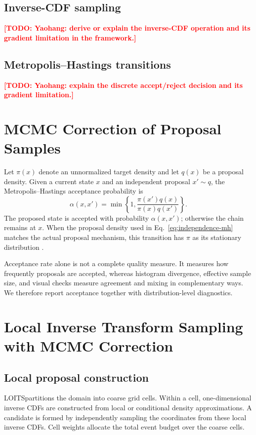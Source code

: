\documentclass[11pt]{article}
\newcommand{\todo}[1]{\textcolor{red}{\textbf{[TODO: #1]}}}
\newcommand{\methodloits}{\textsc{LOITS}}
\begin{document}
\subsection{Inverse-CDF sampling}
\todo{Yaohang: derive or explain the inverse-CDF operation and its gradient limitation in the framework.}

\subsection{Metropolis--Hastings transitions}
\todo{Yaohang: explain the discrete accept/reject decision and its gradient limitation.}

\section{MCMC Correction of Proposal Samples}
\label{sec:mh}
Let $\pi(x)$ denote an unnormalized target density and let $q(x)$ be a proposal density. Given a current state $x$ and an independent proposal $x' \sim q$, the Metropolis--Hastings acceptance probability is
\begin{equation}
  \alpha(x,x') = \min\left\{1,
  \frac{\pi(x')q(x)}{\pi(x)q(x')}
  \right\}.
  \label{eq:independence-mh}
\end{equation}
The proposed state is accepted with probability $\alpha(x,x')$; otherwise the chain remains at $x$. When the proposal density used in Eq.~\eqref{eq:independence-mh} matches the actual proposal mechanism, this transition has $\pi$ as its stationary distribution \citep{metropolis1953,hastings1970}.

Acceptance rate alone is not a complete quality measure. It measures how frequently proposals are accepted, whereas histogram divergence, effective sample size, and visual checks measure agreement and mixing in complementary ways. We therefore report acceptance together with distribution-level diagnostics.

\section{Local Inverse Transform Sampling with MCMC Correction}
\label{sec:loits}
\subsection{Local proposal construction}
\methodloits partitions the domain into coarse grid cells. Within a cell, one-dimensional inverse CDFs are constructed from local or conditional density approximations. A candidate is formed by independently sampling the coordinates from these local inverse CDFs. Cell weights allocate the total event budget over the coarse cells.
\end{document}
